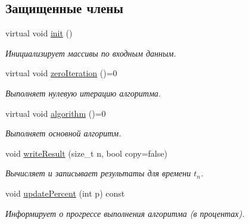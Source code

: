 \subsection*{Защищенные члены}
\begin{DoxyCompactItemize}
\item 
virtual void \hyperlink{class_core_1_1_filter_ae8bb3b004400941317a1e9fdc1ca2c58}{init} ()\hypertarget{class_core_1_1_filter_ae8bb3b004400941317a1e9fdc1ca2c58}{}\label{class_core_1_1_filter_ae8bb3b004400941317a1e9fdc1ca2c58}

\begin{DoxyCompactList}\small\item\em Инициализирует массивы по входным данным. \end{DoxyCompactList}\item 
virtual void \hyperlink{class_core_1_1_filter_af95880b734c4b8dc3d8c02f222b32506}{zero\+Iteration} ()=0\hypertarget{class_core_1_1_filter_af95880b734c4b8dc3d8c02f222b32506}{}\label{class_core_1_1_filter_af95880b734c4b8dc3d8c02f222b32506}

\begin{DoxyCompactList}\small\item\em Выполняет нулевую итерацию алгоритма. \end{DoxyCompactList}\item 
virtual void \hyperlink{class_core_1_1_filter_a438681ee3e54aba2148042d9f8011ab8}{algorithm} ()=0\hypertarget{class_core_1_1_filter_a438681ee3e54aba2148042d9f8011ab8}{}\label{class_core_1_1_filter_a438681ee3e54aba2148042d9f8011ab8}

\begin{DoxyCompactList}\small\item\em Выполняет основной алгоритм. \end{DoxyCompactList}\item 
void \hyperlink{class_core_1_1_filter_a84c7d1ebe3931974c3beccf27f13c1c5}{write\+Result} (size\+\_\+t n, bool copy=false)
\begin{DoxyCompactList}\small\item\em Вычисляет и записывает результаты для времени $t_n$. \end{DoxyCompactList}\item 
void \hyperlink{class_core_1_1_filter_ab504b0d7d77b1af386e59b5158fbdd69}{update\+Percent} (int p) const \hypertarget{class_core_1_1_filter_ab504b0d7d77b1af386e59b5158fbdd69}{}\label{class_core_1_1_filter_ab504b0d7d77b1af386e59b5158fbdd69}

\begin{DoxyCompactList}\small\item\em Информирует о прогрессе выполнения алгоритма (в процентах). \end{DoxyCompactList}\end{DoxyCompactItemize}

